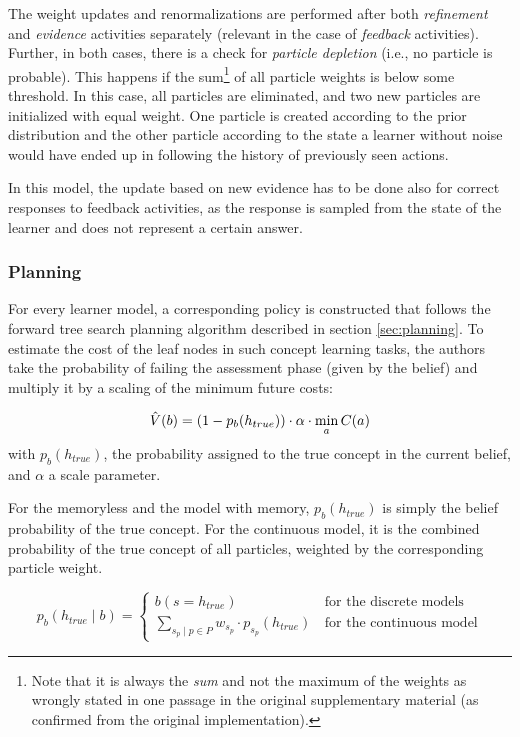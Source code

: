 The weight updates and renormalizations are performed after both \textit{refinement} and \textit{evidence} activities separately (relevant in the case of \textit{feedback} activities).
Further, in both cases, there is a check for \textit{particle depletion} (i.e., no particle is probable).
This happens if the sum\footnote{Note that it is always the \textit{sum} and not the maximum of the weights as wrongly stated in one passage in the original supplementary material (as confirmed from the original implementation).} of all particle weights is below some threshold.
In this case, all particles are eliminated, and two new particles are initialized with equal weight.
One particle is created according to the prior distribution and the other particle according to the state a learner without noise would have ended up in following the history of previously seen actions. 

In this model, the update based on new evidence has to be done also for correct responses to feedback activities, as the response is sampled from the state of the learner and does not represent a certain answer.

\subsubsection{Planning}

For every learner model, a corresponding policy is constructed that follows the forward tree search planning algorithm described in section \ref{sec:planning}.
To estimate the cost of the leaf nodes in such concept learning tasks, 
the authors take the probability of failing the assessment phase (given by the belief) and multiply it by a scaling of the minimum future costs:

\begin{equation}
    \Hat{V}(b) = (1 - p_b(h_{true})) \cdot \alpha \cdot \min_a{C(a)}
    \label{eq:leaf-calc}
\end{equation}
with $p_b(h_{true})$, the probability assigned to the true concept in the current belief, and $\alpha$ a scale parameter. 

For the memoryless and the model with memory, $p_b(h_{true})$ is simply the belief probability of the true concept. 
For the continuous model, it is the combined probability of the true concept of all particles, weighted by the corresponding particle weight.

\begin{equation}
    p_b(h_{true} \mid b) = \begin{cases}
        b(s = h_{true}) & \, \text{for the discrete models} \\
        \sum_{s_p \mid p \in P}{w_{s_p} \cdot p_{s_p}(h_{true})} & \, \text{for the continuous model}
    \end{cases}
\end{equation}

